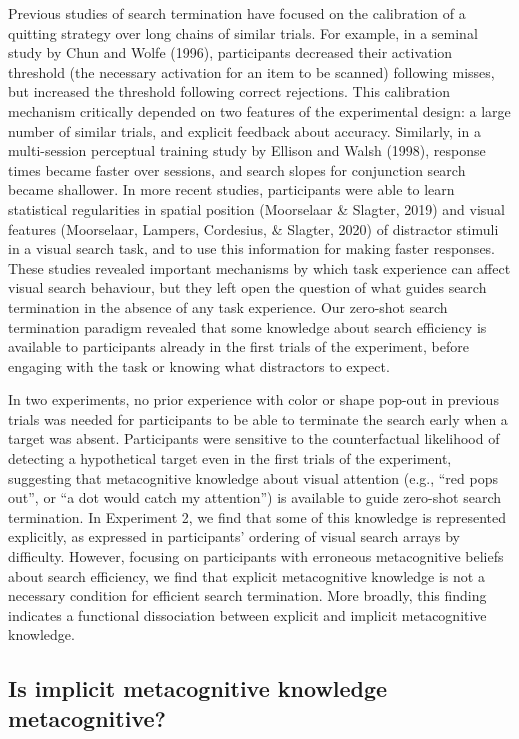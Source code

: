 \documentclass[
  english,
  man]{apa6}
\begin{document}
Previous studies of search termination have focused on the calibration of a quitting strategy over long chains of similar trials. For example, in a seminal study by Chun and Wolfe (1996), participants decreased their activation threshold (the necessary activation for an item to be scanned) following misses, but increased the threshold following correct rejections. This calibration mechanism critically depended on two features of the experimental design: a large number of similar trials, and explicit feedback about accuracy. Similarly, in a multi-session perceptual training study by Ellison and Walsh (1998), response times became faster over sessions, and search slopes for conjunction search became shallower. In more recent studies, participants were able to learn statistical regularities in spatial position (Moorselaar \& Slagter, 2019) and visual features (Moorselaar, Lampers, Cordesius, \& Slagter, 2020) of distractor stimuli in a visual search task, and to use this information for making faster responses. These studies revealed important mechanisms by which task experience can affect visual search behaviour, but they left open the question of what guides search termination in the absence of any task experience. Our zero-shot search termination paradigm revealed that some knowledge about search efficiency is available to participants already in the first trials of the experiment, before engaging with the task or knowing what distractors to expect.

In two experiments, no prior experience with color or shape pop-out in previous trials was needed for participants to be able to terminate the search early when a target was absent. Participants were sensitive to the counterfactual likelihood of detecting a hypothetical target even in the first trials of the experiment, suggesting that metacognitive knowledge about visual attention (e.g., \enquote{red pops out}, or \enquote{a dot would catch my attention}) is available to guide zero-shot search termination. In Experiment 2, we find that some of this knowledge is represented explicitly, as expressed in participants' ordering of visual search arrays by difficulty. However, focusing on participants with erroneous metacognitive beliefs about search efficiency, we find that explicit metacognitive knowledge is not a necessary condition for efficient search termination. More broadly, this finding indicates a functional dissociation between explicit and implicit metacognitive knowledge.

\hypertarget{is-implicit-metacognitive-knowledge-metacognitive}{%
\subsection{Is implicit metacognitive knowledge metacognitive?}\label{is-implicit-metacognitive-knowledge-metacognitive}}
\end{document}

